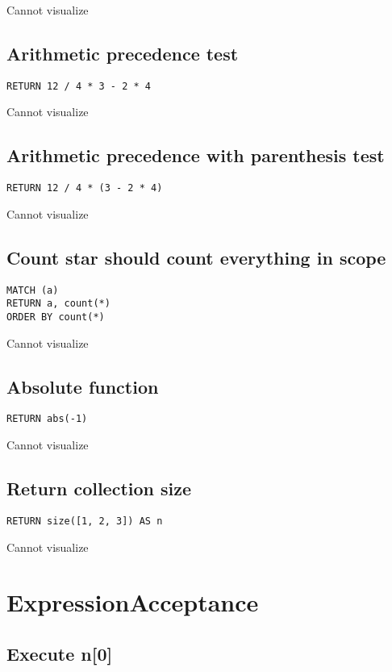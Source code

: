 Cannot visualize
\subsection{Arithmetic precedence test}

\begin{lstlisting}
RETURN 12 / 4 * 3 - 2 * 4
\end{lstlisting}

Cannot visualize
\subsection{Arithmetic precedence with parenthesis test}

\begin{lstlisting}
RETURN 12 / 4 * (3 - 2 * 4)
\end{lstlisting}

Cannot visualize
\subsection{Count star should count everything in scope}

\begin{lstlisting}
MATCH (a)
RETURN a, count(*)
ORDER BY count(*)
\end{lstlisting}

Cannot visualize
\subsection{Absolute function}

\begin{lstlisting}
RETURN abs(-1)
\end{lstlisting}

Cannot visualize
\subsection{Return collection size}

\begin{lstlisting}
RETURN size([1, 2, 3]) AS n
\end{lstlisting}

Cannot visualize
\section{ExpressionAcceptance}

\subsection{Execute n[0]}


